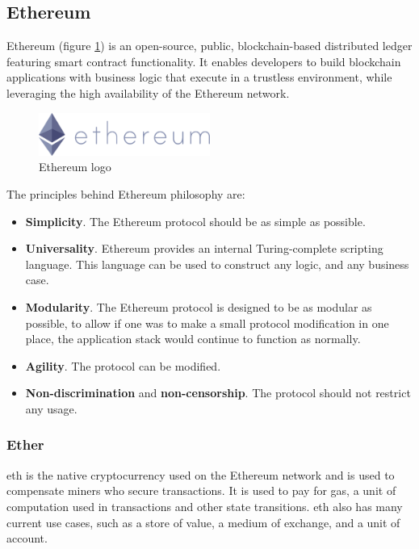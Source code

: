 \subsection{Ethereum}
Ethereum\cite{ethereum} (figure \ref{fig:ethereum_logo}) is an open-source, public, blockchain-based distributed ledger featuring smart contract functionality. It enables developers to build blockchain applications with business logic that execute in a trustless environment, while leveraging the high availability of the Ethereum network.
\begin{figure}[h]
    \centering
    \includegraphics[width=0.5\textwidth]{images/State of the Art/ethereum/ethereum-logo-portrait-purple.png}
    \caption{Ethereum logo}
    \label{fig:ethereum_logo}
\end{figure}
The principles behind Ethereum philosophy are\cite{ethereumWhitepaper}:
\begin{itemize}
    \item \textbf{Simplicity}. The Ethereum protocol should be as simple as possible.
    \item \textbf{Universality}. Ethereum provides an internal Turing-complete scripting language. This language can be used to construct any logic, and any business case.
    \item \textbf{Modularity}. The Ethereum protocol is designed to be as modular as possible, to allow if one was to make a small protocol modification in one place, the application stack would continue to function as normally.
    \item \textbf{Agility}. The protocol can be modified.
    \item \textbf{Non-discrimination} and \textbf{non-censorship}. The protocol should not restrict any usage.
\end{itemize}

\subsubsection{Ether}
\acrfull{eth} is the native cryptocurrency used on the Ethereum network and is used to compensate miners who secure transactions. It is used to pay for gas, a unit of computation used in transactions and other state transitions.
\acrlong{eth} also has many current use cases, such as a store of value, a medium of exchange, and a unit of account.

